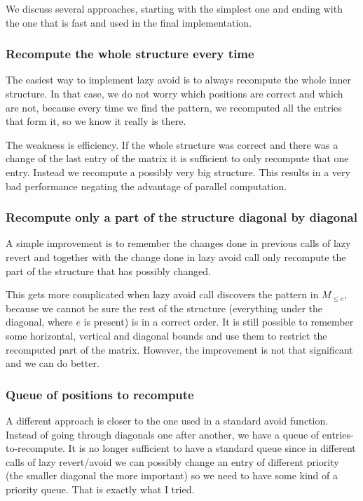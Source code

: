 We discuss several approaches, starting with the simplest one and ending with the one that is fast and used in the final implementation.

\subsubsection{Recompute the whole structure every time}
The easiest way to implement lazy avoid is to always recompute the whole inner structure. In that case, we do not worry which positions are correct and which are not, because every time we find the pattern, we recomputed all the entries that form it, so we know it really is there.

The weakness is efficiency. If the whole structure was correct and there was a change of the last entry of the matrix it is sufficient to only recompute that one entry. Instead we recompute a possibly very big structure. This results in a very bad performance negating the advantage of parallel computation.
\subsubsection{Recompute only a part of the structure diagonal by diagonal}
A simple improvement is to remember the changes done in previous calls of lazy revert and together with the change done in lazy avoid call only recompute the part of the structure that has possibly changed.

This gets more complicated when lazy avoid call discovers the pattern in $M_{\leq e}$, because we cannot be sure the rest of the structure (everything under the diagonal, where $e$ is present) is in a correct order. It is still possible to remember some horizontal, vertical and diagonal bounds and use them to restrict the recomputed part of the matrix. However, the improvement is not that significant and we can do better.
\subsubsection{Queue of positions to recompute}
A different approach is closer to the one used in a standard avoid function. Instead of going through diagonals one after another, we have a queue of entries-to-recompute. It is no longer sufficient to have a standard queue since in different calls of lazy revert/avoid we can possibly change an entry of different priority (the smaller diagonal the more important) so we need to have some kind of a priority queue. That is exactly what I tried.

